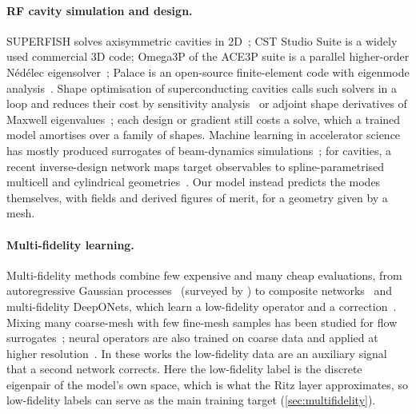 \paragraph{RF cavity simulation and design.}
SUPERFISH solves axisymmetric cavities in 2D~\citep{halbach1976superfish}; CST Studio Suite is a widely used commercial 3D code; Omega3P of the ACE3P suite is a parallel higher-order Nédélec eigensolver~\citep{lee2009omega3p,ko2010advances}; Palace is an open-source finite-element code with eigenmode analysis~\citep{awslabs2023palace}.
Shape optimisation of superconducting cavities calls such solvers in a loop and reduces their cost by sensitivity analysis~\citep{kranjcevic2019constrained} or adjoint shape derivatives of Maxwell eigenvalues~\citep{ziegler2024gradient,herter2024numerical}; each design or gradient still costs a solve, which a trained model amortises over a family of shapes.
Machine learning in accelerator science has mostly produced surrogates of beam-dynamics simulations~\citep{edelen2020machine}; for cavities, a recent inverse-design network maps target observables to spline-parametrised multicell and cylindrical geometries~\citep{yaker2026neural}.
Our model instead predicts the modes themselves, with fields and derived figures of merit, for a geometry given by a mesh.

\paragraph{Multi-fidelity learning.}
Multi-fidelity methods combine few expensive and many cheap evaluations, from autoregressive Gaussian processes~\citep{kennedy2000predicting} (surveyed by \citet{peherstorfer2018survey}) to composite networks~\citep{meng2020composite} and multi-fidelity DeepONets, which learn a low-fidelity operator and a correction~\citep{lu2022multifidelity,howard2023multifidelity}.
Mixing many coarse-mesh with few fine-mesh samples has been studied for flow surrogates~\citep{song2021transfer}; neural operators are also trained on coarse data and applied at higher resolution~\citep{li2021fourier,li2024physics}.
In these works the low-fidelity data are an auxiliary signal that a second network corrects.
Here the low-fidelity label is the discrete eigenpair of the model's own space, which is what the Ritz layer approximates, so low-fidelity labels can serve as the main training target (\cref{sec:multifidelity}).
